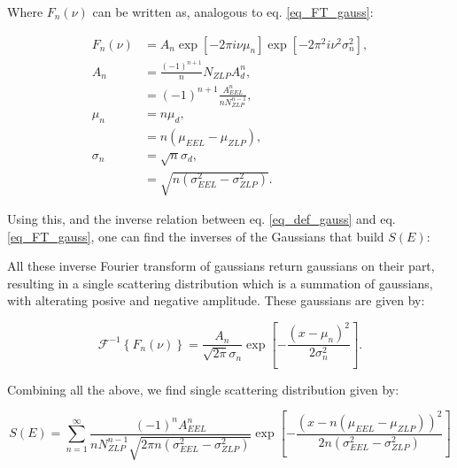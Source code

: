 Where $F_n(\nu)$ can be written as, analogous to eq. \eqref{eq_FT_gauss}:

\begin{equation}
    \begin{aligned}
F_n (\nu)&= A_{n}\exp{[-2\pi i \nu \mu_n]} \exp{[-2\pi^2 i \nu^2 \sigma_{n}^2]},\\
A_{n} &= \frac{(-1)^{n+1}}{n} N_{ZLP}A_d^n,\\
&= (-1)^{n+1} \frac{A_{EEL}^n}{n N_{ZLP}^{n-1}}, \\
\mu_n &= n\mu_d,\\
&= n(\mu_{EEL} - \mu_{ZLP}), \\
\sigma_{n} &= \sqrt{n}\sigma_d, \\
&= \sqrt{n(\sigma_{EEL}^2 - \sigma_{ZLP}^2)}.
    \end{aligned}
\end{equation}



Using this, and the inverse relation between eq. \eqref{eq_def_gauss} and eq. \eqref{eq_FT_gauss}, one can find the inverses of the Gaussians that build $S(E)$:

All these inverse Fourier transform of gaussians return gaussians on their part, resulting in a single scattering distribution which is a summation of gaussians, with alterating posive and negative amplitude. These gaussians are given by:

\begin{equation}
\mathcal{F}^{-1}\left\{ F_n(\nu) \right\} = \frac{A_n}{\sqrt{2\pi}\sigma_n} \exp{\left[-\frac{(x-\mu_n)^2}{2\sigma_n^2}\right]}.
\end{equation}


Combining all the above, we find single scattering distribution given by:


\begin{equation}
S(E) = \sum_{n=1}^\infty \frac{(-1)^n A_{EEL}^n}{n N_{ZLP}^{n-1}\sqrt{2\pi n(\sigma_{EEL}^2 - \sigma_{ZLP}^2)}} \exp{\left[-\frac{(x-n(\mu_{EEL} - \mu_{ZLP}))^2}{2n(\sigma_{EEL}^2 - \sigma_{ZLP}^2)}\right]}
\end{equation}



